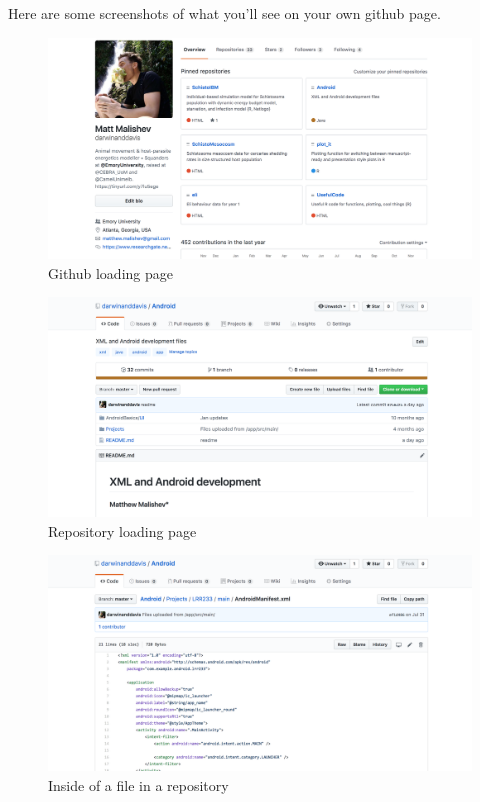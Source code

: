 \documentclass[10,portrait]{article}
\begin{document}
\newpage  

Here are some screenshots of what you'll see on your own github page.

\begin{figure}
\centering
\includegraphics{loadingpage.png}
\caption{Github loading page}
\end{figure}

\begin{figure}
\centering
\includegraphics{repopage.png}
\caption{Repository loading page}
\end{figure}

\begin{figure}
\centering
\includegraphics{filepage.png}
\caption{Inside of a file in a repository}
\end{figure}
\end{document}
